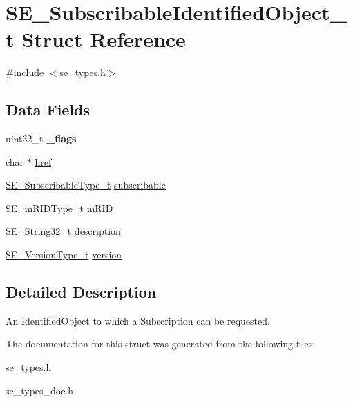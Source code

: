 \hypertarget{structSE__SubscribableIdentifiedObject__t}{}\section{S\+E\+\_\+\+Subscribable\+Identified\+Object\+\_\+t Struct Reference}
\label{structSE__SubscribableIdentifiedObject__t}


{\ttfamily \#include $<$se\+\_\+types.\+h$>$}

\subsection*{Data Fields}
\begin{DoxyCompactItemize}
\item 
uint32\+\_\+t {\bfseries \+\_\+flags}
\item 
char $\ast$ \hyperlink{group__SubscribableIdentifiedObject_gaa2fe2542f71e3344bd7da8a0505a0264}{href}
\item 
\hyperlink{group__SubscribableType_ga5c41f553d369710ed34619266bf2551e}{S\+E\+\_\+\+Subscribable\+Type\+\_\+t} \hyperlink{group__SubscribableIdentifiedObject_gad1ef79a6cf69c3477a8dea9e68d85663}{subscribable}
\item 
\hyperlink{group__mRIDType_gac74622112f3a388a2851b2289963ba5e}{S\+E\+\_\+m\+R\+I\+D\+Type\+\_\+t} \hyperlink{group__SubscribableIdentifiedObject_gabbd15aaa5ff966d28a471469529cbbb5}{m\+R\+ID}
\item 
\hyperlink{group__String32_gac9f59b06b168b4d2e0d45ed41699af42}{S\+E\+\_\+\+String32\+\_\+t} \hyperlink{group__SubscribableIdentifiedObject_ga8521a2f1372171feb07ee6bac680c5a5}{description}
\item 
\hyperlink{group__VersionType_ga4b8d27838226948397ed99f67d46e2ae}{S\+E\+\_\+\+Version\+Type\+\_\+t} \hyperlink{group__SubscribableIdentifiedObject_gac02228152f017ea425ff1f68de5d7832}{version}
\end{DoxyCompactItemize}


\subsection{Detailed Description}
An Identified\+Object to which a Subscription can be requested. 

The documentation for this struct was generated from the following files\+:\begin{DoxyCompactItemize}
\item 
se\+\_\+types.\+h\item 
se\+\_\+types\+\_\+doc.\+h\end{DoxyCompactItemize}
